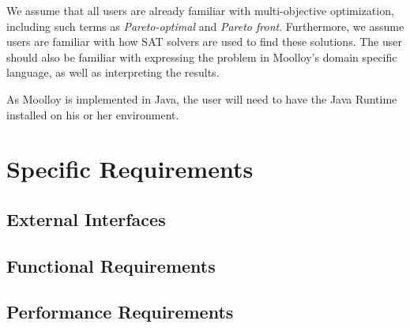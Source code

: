 \documentclass[11pt]{article}
\theoremstyle{definition}
\begin{document}
We assume that all users are already familiar with multi-objective
optimization, including such terms as \textit{Pareto-optimal} and
\textit{Pareto front}. Furthermore, we assume users are familiar with
how SAT solvers are used to find these solutions. The user should also
be familiar with expressing the problem in Moolloy's domain specific
language, as well as interpreting the results.



As Moolloy is implemented in Java, the user will need to have the Java
Runtime installed on his or her environment.

\section{Specific Requirements}

\subsection{External Interfaces}

\subsection{Functional Requirements}

\subsection{Performance Requirements}\label{sec:perf_req}
\end{document}
